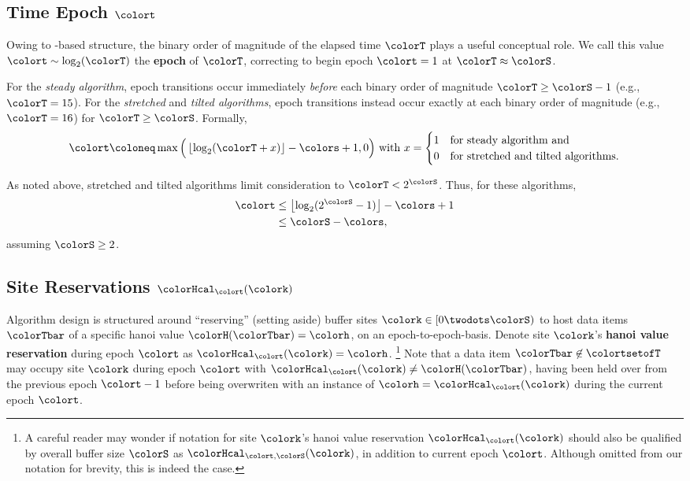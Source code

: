 \subsection{Time Epoch $\colort$}
\label{sec:notation-epoch}

Owing to \hv{}-based structure, the binary order of magnitude of the elapsed time $\colorT$ plays a useful conceptual role.
We call this value $\colort \sim \log_2(\colorT)$ the \textbf{epoch} of $\colorT$, correcting to begin epoch $\colort=1$ at $\colorT \approx \colorS$.

For the \textit{steady algorithm}, epoch transitions occur immediately \textit{before} each binary order of magnitude $\colorT \geq \colorS - 1$ (e.g.,  $\colorT = 15$).
For the \textit{stretched} and \textit{tilted algorithms}, epoch transitions instead occur exactly at each binary order of magnitude (e.g., $\colorT = 16$) for $\colorT \geq \colorS$.
Formally,
\begin{equation}
\colort
\coloneq
\max\Big(\left\lfloor \log_2(\colorT+x) \right\rfloor - \colors + 1, 0\Big)
\text{ with }
x =
\begin{cases}
1 & \text{for steady algorithm and} \\
0 & \text{for stretched and tilted algorithms.}
\end{cases}
\label{eqn:epoch-defn}
\end{equation}

As noted above, stretched and tilted algorithms limit consideration to $\colorT < 2^{\colorS}$.
Thus, for these algorithms,
\begin{align*}
\colort &\leq \left\lfloor\log_2(2^{\colorS} - 1)\right\rfloor - \colors + 1 \\
&\leq \colorS - \colors,
\end{align*}
assuming $\colorS \geq 2$.

\subsection{Site Reservations $\colorHcal_{\colort}(\colork)$}
\label{sec:notation-reservation}

Algorithm design is structured around ``reserving'' (setting aside) buffer sites $\colork \in [0\twodots\colorS)$ to host data items $\colorTbar$ of a specific hanoi value $\colorH(\colorTbar) = \colorh$, on an epoch-to-epoch-basis.
Denote site $\colork$'s \textbf{hanoi value reservation} during epoch $\colort$ as $\colorHcal_{\colort}(\colork) = \colorh$.%
\footnote{%
A careful reader may wonder if notation for site $\colork$'s hanoi value reservation $\colorHcal_{\colort}(\colork)$ should also be qualified by overall buffer size $\colorS$ as $\colorHcal_{\colort,\colorS}(\colork)$, in addition to current epoch $\colort$.
Although omitted from our notation for brevity, this is indeed the case.
}
Note that a data item $\colorTbar \not\in \colortsetofT$ may occupy site $\colork$ during epoch $\colort$ with $\colorHcal_{\colort}(\colork) \neq \colorH(\colorTbar)$, having been held over from the previous epoch $\colort - 1$ before being overwriten with an instance of \hv{} $\colorh = \colorHcal_{\colort}(\colork)$ during the current epoch $\colort$.

